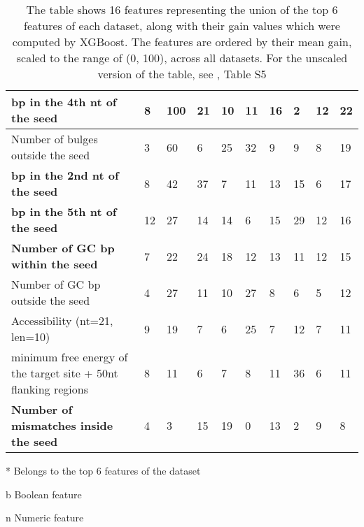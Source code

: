 \documentclass{bmcart}
\begin{document}
\begin{table}[h!]
\begin{threeparttable}
{\begin{tabular}{|l|l|l|l|l|l|l|l|l|l|}
\textbf{bp in the 4th nt of the seed\tnote{b}}                    & 8            & 100\tnote{*}          & 21           & 10          & 11          & 16          & 2           & 12          & 22            \\ \hline
Number of bulges outside the seed\tnote{n}                 & 3            & 60\tnote{*}           & 6            & 25\tnote{*}          & 32\tnote{*}          & 9           & 9           & 8           & 19            \\ \hline
\textbf{bp in the 2nd nt of the seed\tnote{b}}                    & 8            & 42           & 37\tnote{*}           & 7           & 11          & 13          & 15          & 6           & 17            \\ \hline
\textbf{bp in the 5th nt of the seed\tnote{b}}                    & 12           & 27           & 14           & 14          & 6           & 15          & 29\tnote{*}          & 12          & 16            \\ \hline
\textbf{Number of GC bp within the seed\tnote{n}}              & 7            & 22           & 24\tnote{*}           & 18\tnote{*}          & 12          & 13          & 11          & 12          & 15            \\ \hline
Number of GC bp outside the seed\tnote{n}                         & 4            & 27           & 11           & 10          & 27\tnote{*}          & 8           & 6           & 5           & 12            \\ \hline
Accessibility (nt=21, len=10)\tnote{n}                                    & 9            & 19           & 7            & 6           & 25          & 7           & 12          & 7           & 11            \\ \hline
minimum free energy of the target site + 50nt flanking regions\tnote{n}            & 8            & 11           & 6            & 7           & 8           & 11          & 36\tnote{*}          & 6           & 11            \\ \hline
\textbf{Number of mismatches inside the seed\tnote{n}}    & 4            & 3            & 15           & 19\tnote{*}          & 0           & 13          & 2           & 9           & 8             \\ \hline
\end{tabular}}
\begin{tablenotes}\footnotesize
\item[*] Belongs to the top 6 features of the dataset
\item[b] Boolean feature
\item[n] Numeric feature

\end{tablenotes}
 \end{threeparttable}
 \caption*{The table shows 16 features representing the union of the top 6 features of each dataset, along with their gain values which were computed by XGBoost. The features are ordered by their mean gain, scaled to the range of (0, 100), across all datasets. For the unscaled version of the table, see , Table S5}
\end{table}
\end{document}
